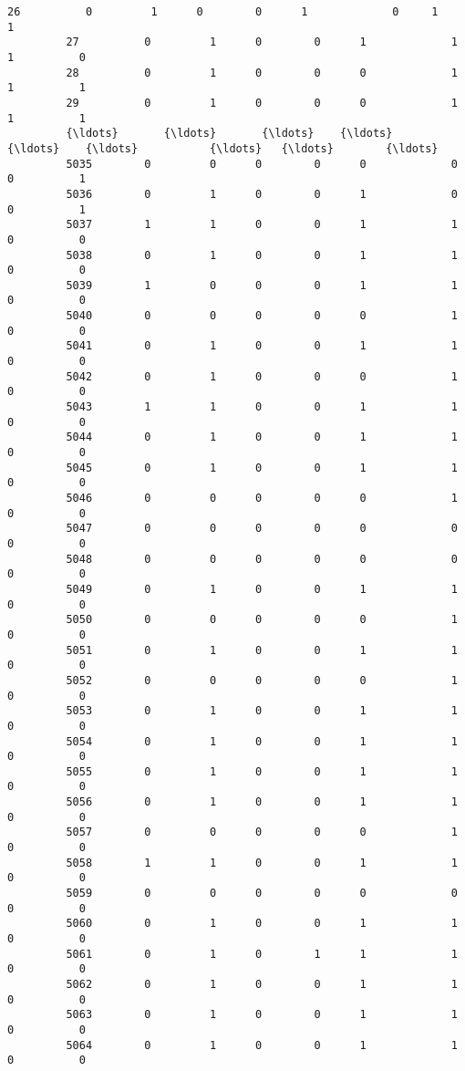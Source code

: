 \documentclass[11pt]{article}
\begin{document}
\begin{Verbatim}[commandchars=\\\{\}]
         26          0         1      0        0      1             0     1          1   
         27          0         1      0        0      1             1     1          0   
         28          0         1      0        0      0             1     1          1   
         29          0         1      0        0      0             1     1          1   
         {\ldots}       {\ldots}       {\ldots}    {\ldots}      {\ldots}    {\ldots}           {\ldots}   {\ldots}        {\ldots}   
         5035        0         0      0        0      0             0     0          1   
         5036        0         1      0        0      1             0     0          1   
         5037        1         1      0        0      1             1     0          0   
         5038        0         1      0        0      1             1     0          0   
         5039        1         0      0        0      1             1     0          0   
         5040        0         0      0        0      0             1     0          0   
         5041        0         1      0        0      1             1     0          0   
         5042        0         1      0        0      0             1     0          0   
         5043        1         1      0        0      1             1     0          0   
         5044        0         1      0        0      1             1     0          0   
         5045        0         1      0        0      1             1     0          0   
         5046        0         0      0        0      0             1     0          0   
         5047        0         0      0        0      0             0     0          0   
         5048        0         0      0        0      0             0     0          0   
         5049        0         1      0        0      1             1     0          0   
         5050        0         0      0        0      0             1     0          0   
         5051        0         1      0        0      1             1     0          0   
         5052        0         0      0        0      0             1     0          0   
         5053        0         1      0        0      1             1     0          0   
         5054        0         1      0        0      1             1     0          0   
         5055        0         1      0        0      1             1     0          0   
         5056        0         1      0        0      1             1     0          0   
         5057        0         0      0        0      0             1     0          0   
         5058        1         1      0        0      1             1     0          0   
         5059        0         0      0        0      0             0     0          0   
         5060        0         1      0        0      1             1     0          0   
         5061        0         1      0        1      1             1     0          0   
         5062        0         1      0        0      1             1     0          0   
         5063        0         1      0        0      1             1     0          0   
         5064        0         1      0        0      1             1     0          0   
         

\end{Verbatim}
\end{document}
